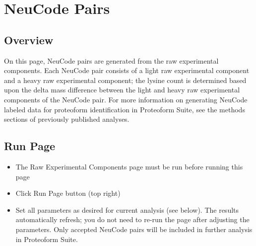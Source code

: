 
\section{NeuCode Pairs}

\subsection{Overview}

On this page, NeuCode pairs are generated from the raw experimental components. Each NeuCode pair consists of a light raw experimental component and a heavy raw experimental component; the lysine count is determined based upon the delta mass difference between the light and heavy raw experimental components of the NeuCode pair. For more information on generating NeuCode labeled data for proteoform identification in Proteoform Suite, see the methods sections of previously published analyses.\supercite{Shortreed2016,Cesnik2018,Dai2017,Dai2019} 

\subsection{Run Page}
\begin{itemize}
\item The Raw Experimental Components page must be run before running this page
\item Click Run Page button (top right)
\item Set all parameters as desired for current analysis (see below). The results automatically refresh; you do not need to re-run the page after adjusting the parameters. Only accepted NeuCode pairs will be included in further analysis in Proteoform Suite.
\end{itemize}

